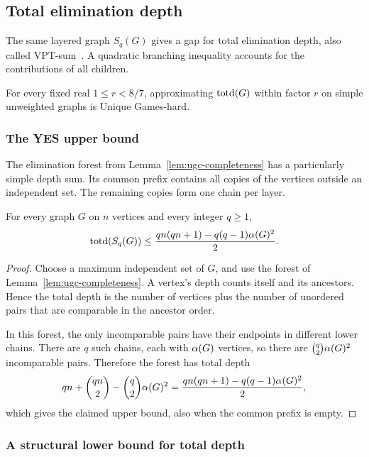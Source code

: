 \subsection{Total elimination depth}
\label{sec:total-depth}

The same layered graph $S_q(G)$ gives a gap for total elimination
depth, also called VPT-sum~\cite{HogemoEtAl2021}. A quadratic
branching inequality accounts for the contributions of all children.

\begin{theorem}\label{thm:total-depth-ugc}
For every fixed real $1\leq r<8/7$, approximating $\operatorname{totd}(G)$ within
factor $r$ on simple unweighted graphs is Unique Games-hard.
\end{theorem}

\subsubsection{The YES upper bound}

The elimination forest from Lemma~\ref{lem:ugc-completeness} has a
particularly simple depth sum. Its common prefix contains all copies
of the vertices outside an independent set. The remaining copies form
one chain per layer.

\begin{lemma}
\label{lem:total-depth-completeness}
For every graph $G$ on $n$ vertices and every integer $q\geq1$,
\[
 \operatorname{totd}(S_q(G))\leq
 \frac{qn(qn+1)-q(q-1)\alpha(G)^2}{2}.
\]
\end{lemma}

\begin{proof}
Choose a maximum independent set of $G$, and use the forest of
Lemma~\ref{lem:ugc-completeness}. A vertex's depth counts itself and
its ancestors. Hence the total depth is the number of
vertices plus the number of unordered pairs that are comparable
in the ancestor order.

In this forest, the only incomparable pairs have their endpoints in
different lower chains. There are $q$ such chains, each with
$\alpha(G)$ vertices, so there are
$\binom q2\alpha(G)^2$ incomparable pairs. Therefore the forest has
total depth
\[
 qn+\binom{qn}{2}-\binom q2\alpha(G)^2
 =\frac{qn(qn+1)-q(q-1)\alpha(G)^2}{2},
\]
which gives the claimed upper bound, also when the common prefix is empty.
\end{proof}

\subsubsection{A structural lower bound for total depth}

